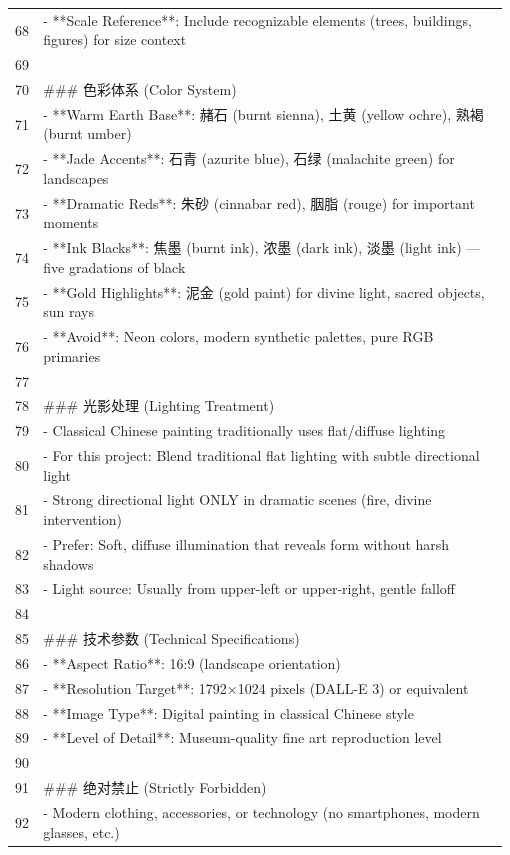 \begin{longtable}{@{}>{\RaggedLeft\arraybackslash\footnotesize}p{0.04\linewidth}@{\hspace{0.8em}}>{\RaggedRight\arraybackslash\ttfamily\scriptsize}p{0.935\linewidth}@{}}
68 & - **Scale Reference**: Include recognizable elements (trees, buildings, figures) for size context\\
69 & \mbox{}\\
70 & \#\#\# 色彩体系 (Color System)\\
71 & - **Warm Earth Base**: 赭石 (burnt sienna), 土黄 (yellow ochre), 熟褐 (burnt umber)\\
72 & - **Jade Accents**: 石青 (azurite blue), 石绿 (malachite green) for landscapes\\
73 & - **Dramatic Reds**: 朱砂 (cinnabar red), 胭脂 (rouge) for important moments\\
74 & - **Ink Blacks**: 焦墨 (burnt ink), 浓墨 (dark ink), 淡墨 (light ink) — five gradations of black\\
75 & - **Gold Highlights**: 泥金 (gold paint) for divine light, sacred objects, sun rays\\
76 & - **Avoid**: Neon colors, modern synthetic palettes, pure RGB primaries\\
77 & \mbox{}\\
78 & \#\#\# 光影处理 (Lighting Treatment)\\
79 & - Classical Chinese painting traditionally uses flat/diffuse lighting\\
80 & - For this project: Blend traditional flat lighting with subtle directional light\\
81 & - Strong directional light ONLY in dramatic scenes (fire, divine intervention)\\
82 & - Prefer: Soft, diffuse illumination that reveals form without harsh shadows\\
83 & - Light source: Usually from upper-left or upper-right, gentle falloff\\
84 & \mbox{}\\
85 & \#\#\# 技术参数 (Technical Specifications)\\
86 & - **Aspect Ratio**: 16:9 (landscape orientation)\\
87 & - **Resolution Target**: 1792×1024 pixels (DALL-E 3) or equivalent\\
88 & - **Image Type**: Digital painting in classical Chinese style\\
89 & - **Level of Detail**: Museum-quality fine art reproduction level\\
90 & \mbox{}\\
91 & \#\#\# 绝对禁止 (Strictly Forbidden)\\
92 & - \promptemoji{❌} Modern clothing, accessories, or technology (no smartphones, modern glasses, etc.)\\

\end{longtable}
